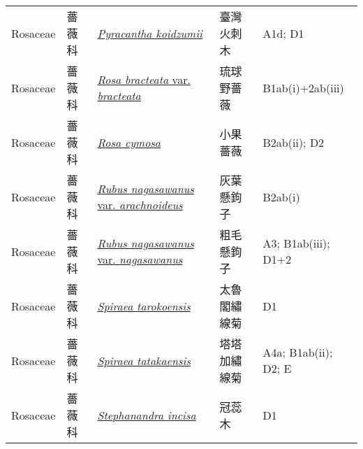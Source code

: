 {\begin{longtable}{L{2.5cm}L{2cm}L{5cm}L{2.5cm}L{3cm}}
    Rosaceae & 薔薇科 & \href{http://www.theplantlist.org/tpl1.1/search?q=Pyracantha+koidzumii}{\textit{Pyracantha koidzumii} } & 臺灣火刺木 & A1d; D1    \\
    Rosaceae & 薔薇科 & \href{http://www.theplantlist.org/tpl1.1/search?q=Rosa+bracteata+var.+bracteata}{\textit{Rosa bracteata} var. \textit{bracteata} } & 琉球野薔薇 & B1ab(i)+2ab(iii)    \\
    Rosaceae & 薔薇科 & \href{http://www.theplantlist.org/tpl1.1/search?q=Rosa+cymosa}{\textit{Rosa cymosa} } & 小果薔薇 & B2ab(ii); D2    \\
    Rosaceae & 薔薇科 & \href{http://www.theplantlist.org/tpl1.1/search?q=Rubus+nagasawanus+var.+arachnoideus}{\textit{Rubus nagasawanus} var. \textit{arachnoideus} } & 灰葉懸鉤子 & B2ab(i)    \\
    Rosaceae & 薔薇科 & \href{http://www.theplantlist.org/tpl1.1/search?q=Rubus+nagasawanus+var.+nagasawanus}{\textit{Rubus nagasawanus} var. \textit{nagasawanus} } & 粗毛懸鉤子 & A3; B1ab(iii); D1+2    \\
    Rosaceae & 薔薇科 & \href{http://www.theplantlist.org/tpl1.1/search?q=Spiraea+tarokoensis}{\textit{Spiraea tarokoensis} } & 太魯閣繡線菊 & D1    \\
    Rosaceae & 薔薇科 & \href{http://www.theplantlist.org/tpl1.1/search?q=Spiraea+tatakaensis}{\textit{Spiraea tatakaensis} } & 塔塔加繡線菊 & A4a; B1ab(ii); D2; E    \\
    Rosaceae & 薔薇科 & \href{http://www.theplantlist.org/tpl1.1/search?q=Stephanandra+incisa}{\textit{Stephanandra incisa} } & 冠蕊木 & D1    \\

\end{longtable}}
